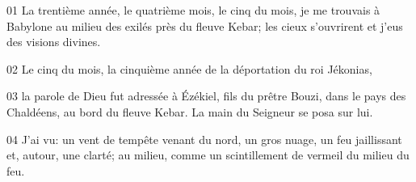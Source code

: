 01 La trentième année, le quatrième mois, le cinq du mois, je me trouvais à Babylone au milieu des exilés près du fleuve Kebar; les cieux s’ouvrirent et j’eus des visions divines.

02 Le cinq du mois, la cinquième année de la déportation du roi Jékonias,

03 la parole de Dieu fut adressée à Ézékiel, fils du prêtre Bouzi, dans le pays des Chaldéens, au bord du fleuve Kebar. La main du Seigneur se posa sur lui.

04 J’ai vu: un vent de tempête venant du nord, un gros nuage, un feu jaillissant et, autour, une clarté; au milieu, comme un scintillement de vermeil du milieu du feu.
